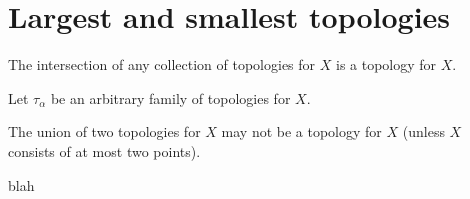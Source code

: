 \section{Largest and smallest topologies}

\begin{problem}
  The intersection of any collection of topologies for $X$ is a topology for $X$.
\end{problem}

\begin{solution}
  Let $\tau_{\alpha}$ be an arbitrary family of topologies for $X$.
\end{solution}

\begin{problem}
  The union of two topologies for $X$ may not be a topology for $X$ (unless $X$ consists of at most two points).
\end{problem}

\begin{solution}
  blah
\end{solution}
